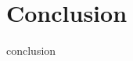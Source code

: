 \makeatletter
    \graphicspath{ {@path} }
\makeatother

\section{Conclusion}
\label{sec:conclusion}

conclusion
